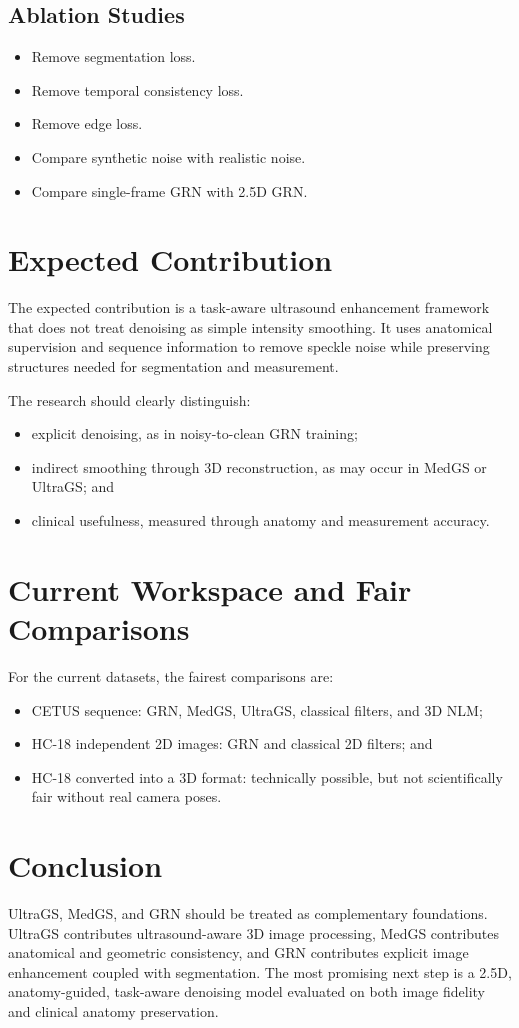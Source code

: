 \documentclass[11pt,a4paper]{article}
\begin{document}
\subsection{Ablation Studies}

\begin{itemize}
    \item Remove segmentation loss.
    \item Remove temporal consistency loss.
    \item Remove edge loss.
    \item Compare synthetic noise with realistic noise.
    \item Compare single-frame GRN with 2.5D GRN.
\end{itemize}

\section{Expected Contribution}

The expected contribution is a task-aware ultrasound enhancement framework that does not treat denoising as simple intensity smoothing. It uses anatomical supervision and sequence information to remove speckle noise while preserving structures needed for segmentation and measurement.

The research should clearly distinguish:
\begin{itemize}
    \item explicit denoising, as in noisy-to-clean GRN training;
    \item indirect smoothing through 3D reconstruction, as may occur in MedGS or UltraGS; and
    \item clinical usefulness, measured through anatomy and measurement accuracy.
\end{itemize}

\section{Current Workspace and Fair Comparisons}

For the current datasets, the fairest comparisons are:
\begin{itemize}
    \item CETUS sequence: GRN, MedGS, UltraGS, classical filters, and 3D NLM;
    \item HC-18 independent 2D images: GRN and classical 2D filters; and
    \item HC-18 converted into a 3D format: technically possible, but not scientifically fair without real camera poses.
\end{itemize}

\section{Conclusion}

UltraGS, MedGS, and GRN should be treated as complementary foundations. UltraGS contributes ultrasound-aware 3D image processing, MedGS contributes anatomical and geometric consistency, and GRN contributes explicit image enhancement coupled with segmentation. The most promising next step is a 2.5D, anatomy-guided, task-aware denoising model evaluated on both image fidelity and clinical anatomy preservation.
\end{document}
